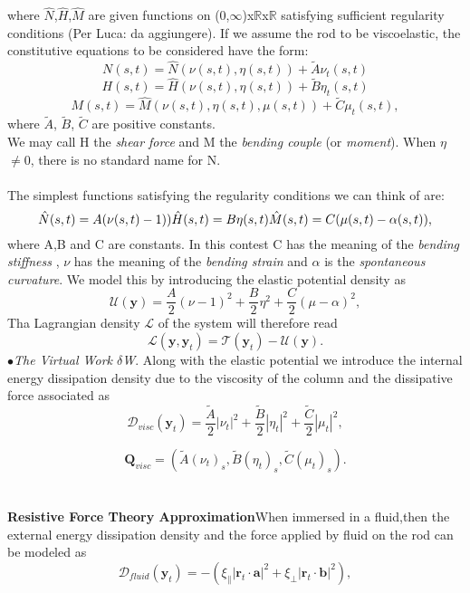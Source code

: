 \documentclass[12pt]{article}
\begin{document}
where $\hat{N}$,$\hat{H}$,$\hat{M}$ are given functions on (0,$\infty$)x$\mathbb{R}$x$\mathbb{R}$ satisfying sufficient regularity conditions (Per Luca: da aggiungere).
If we assume the rod to be viscoelastic, the constitutive equations to be considered have the form:
\[  N (s,t)=  \hat{N}(\nu (s,t),\eta (s,t)) + \tilde{A} \nu_t (s,t)
\]
\[  H (s,t)=  \hat{H}(\nu (s,t),\eta (s,t)) + \tilde{B} \eta_t (s,t)
\]
\[  M (s,t)=  \hat{M}(\nu (s,t),\eta (s,t), \mu(s,t)) + \tilde{C} \mu_t (s,t),
\]
where $\tilde{A}$, $\tilde{B}$, $\tilde{C}$ are positive constants.
\\
We may call H the \emph{shear force} and M the \emph{bending couple} (or \emph{moment}). When $\eta$ $\neq$0, there is no standard name for N.
\\\\
The simplest functions satisfying the regularity conditions we can think of are:
\[
\hat{N}(s,t) = A(\nu(s,t) - 1))\\
\hat{H}(s,t) =B\eta(s,t)\\
\hat{M}(s,t) =C(\mu(s,t) - \alpha(s,t)),
\]
where A,B and C are constants. In this contest C has the meaning of the \emph{bending stiffness} , $\nu$ has the meaning of the \emph{bending strain} and $\alpha$ is the \emph{spontaneous curvature}.
We model this by introducing the elastic potential density  as
\[ \mathcal{U}(\mathbf{y}) = \frac{A}{2} (\nu - 1)^2
+ \frac{B}{2} \eta ^2
+ \frac{C}{2} (\mu -\alpha)^2,
\]
Tha Lagrangian density $\mathcal{L}$ of the system will therefore read
\[ \mathcal{L}(\mathbf{y},\mathbf{y}_t)= \mathcal{T}(\mathbf{y}_t) - \mathcal{U}(\mathbf{y}).
\]
$\bullet$\emph{The Virtual Work $\delta$W}. Along with the elastic potential we introduce the internal energy dissipation density due to the viscosity  of the column and the dissipative force associated as 
\[ \mathcal{D}_{visc}(\mathbf{y}_t) = \frac{\tilde{A}}{2}\left|\nu_t\right|^2 + \frac{\tilde{B}}{2}\left|\eta_t\right|^2
+ \frac{\tilde{C}}{2}\left|\mu_t\right|^2,
\]

\[
\mathbf{Q}_{visc}= (\tilde{A}(\nu_t)_s,\tilde{B}(\eta_t)_s,\tilde{C}(\mu_t)_s).
\]
\\\\
\textbf{Resistive Force Theory Approximation}When immersed in a fluid,then the external energy dissipation density and the force applied by fluid on the rod can be modeled as
\[ \mathcal{D}_{fluid}(\mathbf{y}_t)= -(\xi_\parallel\left|\mathbf{r}_t\cdot\mathbf{a}\right|^2 + \xi_\perp \left|\mathbf{r}_t\cdot\mathbf{b}\right|^2),
\]
\end{document}
